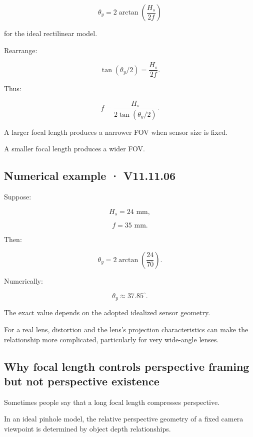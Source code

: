 \[
 \boxed{ \theta_y= 2\arctan\left(\frac{H_s}{2f}\right) }
\]

for the ideal rectilinear model.

Rearrange:

\[
 \tan(\theta_y/2)=\frac{H_s}{2f}.
\]

Thus:

\[
 \boxed{ f=\frac{H_s}{2\tan(\theta_y/2)} }.
\]

A larger focal length produces a narrower FOV when sensor size is fixed.

A smaller focal length produces a wider FOV.

\subsection{Numerical example · V11.11.06}\label{02-foundations-ii-ch034-numerical-example-v11.11.06}

\hypertarget{02-foundations-ii-ch034-numerical-example-v11.11.06}{}

Suppose:

\[
 H_s=24\text{ mm},
\]

\[
 f=35\text{ mm}.
\]

Then:

\[
 \theta_y= 2\arctan\left(\frac{24}{70}\right).
\]

Numerically:

\[
 \boxed{ \theta_y\approx37.85^\circ }.
\]

The exact value depends on the adopted idealized sensor geometry.

For a real lens, distortion and the lens's projection characteristics can make the relationship more complicated, particularly for very wide-angle lenses.

\subsection{Why focal length controls perspective framing but not perspective existence}\label{02-foundations-ii-ch034-why-focal-length-controls-perspective-framing-but-not-perspective-existence}

\hypertarget{02-foundations-ii-ch034-why-focal-length-controls-perspective-framing-but-not-perspective-existence}{}

Sometimes people say that a long focal length compresses perspective.

In an ideal pinhole model, the relative perspective geometry of a fixed camera viewpoint is determined by object depth relationships.

